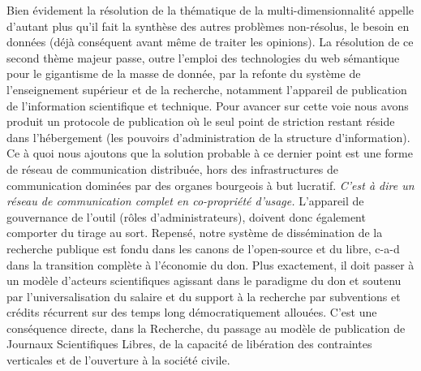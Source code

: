 Bien évidement la résolution de la thématique de la multi-dimensionnalité appelle d'autant plus qu'il fait la synthèse des autres problèmes non-résolus, le besoin en données (déjà conséquent avant même de traiter les opinions).
La résolution de ce second thème majeur passe, outre l'emploi des technologies du web sémantique pour le gigantisme de la masse de donnée, par la refonte du système de l'enseignement supérieur et de la recherche, notamment l'appareil de publication de l'information scientifique et technique.
Pour avancer sur cette voie nous avons produit un protocole de publication où le seul point de striction restant réside dans l'hébergement (les pouvoirs d'administration de la structure d'information).
Ce à quoi nous ajoutons que la solution probable à ce dernier point est une forme de réseau de communication distribuée, hors des infrastructures de communication dominées par des organes bourgeois à but lucratif.
\emph{C'est à dire un réseau de communication complet en co-propriété d'usage.}
L'appareil de gouvernance de l'outil (rôles d'administrateurs), doivent donc également comporter du tirage au sort.
Repensé, notre système de dissémination de la recherche publique est fondu dans les canons de l'open-source et du libre, c-a-d dans la transition complète à l'économie du don.
Plus exactement, il doit passer à un modèle d'acteurs scientifiques agissant dans le paradigme du don et soutenu par l'universalisation du salaire et du support à la recherche par subventions et crédits récurrent sur des temps long démocratiquement allouées.
C'est une conséquence directe, dans la Recherche, du passage au modèle de publication de Journaux Scientifiques Libres, de la capacité de libération des contraintes verticales et de l'ouverture à la société civile.

%


